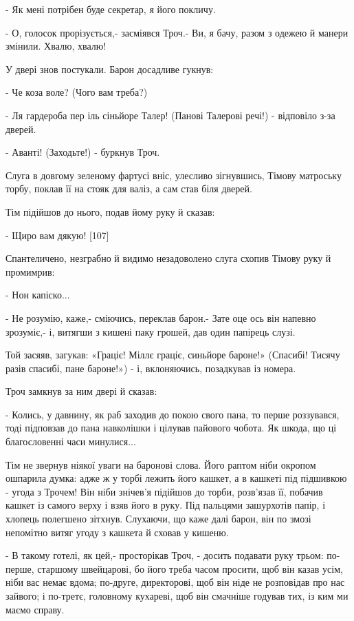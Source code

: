 - Як мені потрібен буде секретар, я його покличу.

- О, голосок прорізується,- засміявся Троч.- Ви, я бачу, разом з одежею й манери змінили. Хвалю, хвалю!

У двері знов постукали. Барон досадливе гукнув:

- Че коза воле? (Чого вам треба?)

- Ля гардероба пер іль сіньйоре Талер! (Панові Талерові речі!) - відповіло з-за дверей.

- Аванті! (Заходьте!) - буркнув Троч.

Слуга в довгому зеленому фартусі вніс, улесливо зігнувшись, Тімову матроську торбу, поклав її на стояк для валіз, а сам став біля дверей.

Тім підійшов до нього, подав йому руку й сказав:

- Щиро вам дякую! [107]

Спантеличено, незграбно й видимо незадоволено слуга схопив Тімову руку й промимрив:

- Нон капіско...

- Не розумію, каже,- сміючись, переклав барон.- Зате оце ось він напевно зрозуміє,- і, витягши з кишені паку грошей, дав один папірець слузі.

Той засяяв, загукав: «Граціє! Міллє граціє, синьйоре бароне!» (Спасибі! Тисячу разів спасибі, пане бароне!») - і, вклоняючись, позадкував із номера.

Троч замкнув за ним двері й сказав:

- Колись, у давнину, як раб заходив до покою свого пана, то перше роззувався, тоді підповзав до пана навколішки і цілував пайового чобота. Як шкода, що ці благословенні часи минулися...

Тім не звернув ніякої уваги на баронові слова. Його раптом ніби окропом ошпарила думка: адже ж у торбі лежить його кашкет, а в кашкеті під підшивкою - угода з Трочем! Він ніби знічев'я підійшов до торби, розв'язав її, побачив кашкет із самого верху і взяв його в руку. Під пальцями зашурхотів папір, і хлопець полегшено зітхнув. Слухаючи, що каже далі барон, він по змозі непомітно витяг угоду з кашкета й сховав у кишеню.

- В такому готелі, як цей,- просторікав Троч, - досить подавати руку трьом: по-перше, старшому швейцарові, бо його треба часом просити, щоб він казав усім, ніби вас немає вдома; по-друге, директорові, щоб він ніде не розповідав про нас зайвого; і по-третє, головному кухареві, щоб він смачніше годував тих, із ким ми маємо справу.

